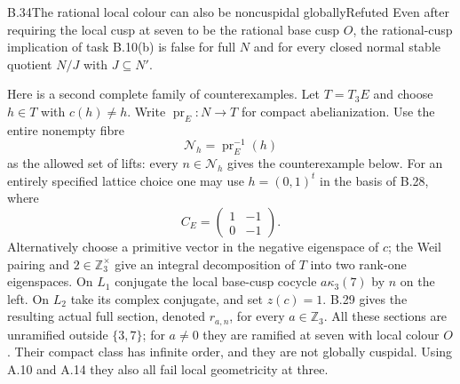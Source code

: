 \begin{statement}{B.34}{The rational local colour can also be noncuspidal globally}{Refuted}
Even after requiring the local cusp at seven to be the
rational base cusp $O$, the rational-cusp implication
of task B.10(b) is false for full $N$ and for every
closed normal stable quotient $N/J$ with $J\subseteq N'$.

Here is a second complete family of counterexamples.
Let $T=T_3E$ and choose $h\in T$ with $c(h)\ne h$.
Write $\operatorname{pr}_E:N\to T$ for compact
abelianization.  Use the entire nonempty fibre
\[
                  \mathcal N_h=\operatorname{pr}_E^{-1}(h)
\]
as the allowed set of lifts: every $n\in\mathcal N_h$
gives the counterexample below.
For an entirely specified lattice choice one may use
$h=(0,1)^t$ in the basis of B.28, where
\[
               C_E=\begin{pmatrix}1&-1\\0&-1\end{pmatrix}.
                                                               \tag{B.34.1}
\]
Alternatively choose a primitive vector in the negative
eigenspace of $c$; the Weil pairing and $2\in\mathbb Z_3^\times$
give an integral decomposition of $T$ into two rank-one
eigenspaces.  On $L_1$ conjugate the local base-cusp
cocycle $a\kappa_3(7)$ by $n$ on the left.  On $L_2$
take its complex conjugate, and set $z(c)=1$.
B.29 gives the resulting actual full section, denoted
$r_{a,n}$, for every $a\in\mathbb Z_3$.
All these sections are unramified outside $\{3,7\}$;
for $a\ne0$ they are ramified at seven with local colour
$O$.  Their compact class has infinite order, and they
are not globally cuspidal.  Using A.10 and A.14 they
also all fail local geometricity at three.
\end{statement}
